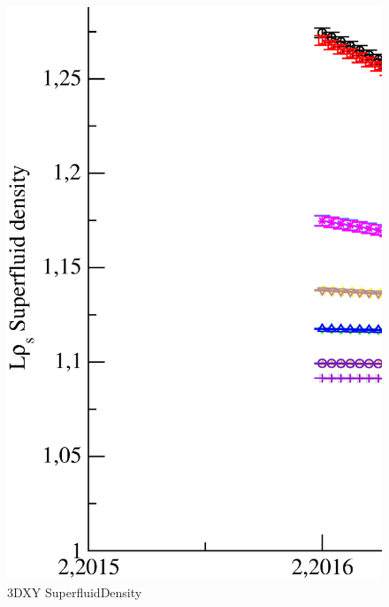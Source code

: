 \begin{figure}[!htpb]
  \centering
  \includegraphics[width=\textwidth]{./plots/3DXY/vsT/SuperfluidDensity.eps}
  \caption{3DXY SuperfluidDensity}
\end{figure}

